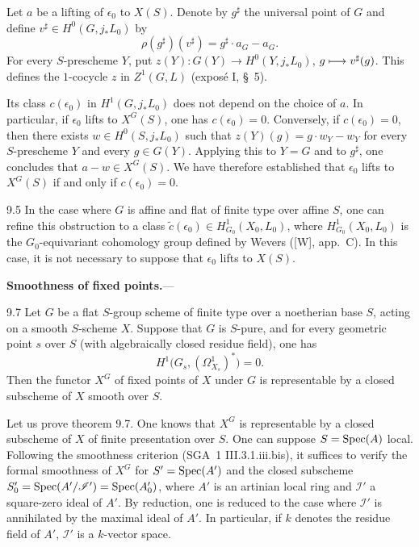 Let $a$ be a lifting of $\epsilon_0$ to $X(S)$. Denote by $g^\sharp$ the universal point of $G$ and define $v^\sharp\in H^0(G,j_*L_0)$ by
\[
\rho(g^\sharp)(v^\sharp)=g^\sharp\cdot a_G-a_G.
\]
For every $S$-prescheme $Y$, put $z(Y):G(Y)\to H^0(Y,j_*L_0)$, $g\longmapsto v^\sharp(g)$. This defines the $1$-cocycle $z$ in $Z^1(G,L)$ (exposé I, §~5).

Its class $c(\epsilon_0)$ in $H^1(G,j_*L_0)$ does not depend on the choice of $a$. In particular, if $\epsilon_0$ lifts to $X^G(S)$, one has $c(\epsilon_0)=0$. Conversely, if $c(\epsilon_0)=0$, then there exists $w\in H^0(S,j_*L_0)$ such that $z(Y)(g)=g\cdot w_Y-w_Y$ for every $S$-prescheme $Y$ and every $g\in G(Y)$. Applying this to $Y=G$ and to $g^\sharp$, one concludes that $a-w\in X^G(S)$. We have therefore established that $\epsilon_0$ lifts to $X^G(S)$ if and only if $c(\epsilon_0)=0$.
\begin{remark}{9.5}\label{XII.9.5}
In the case where $G$ is affine and flat of finite type over affine $S$, one can refine this obstruction to a class $\widetilde c(\epsilon_0)\in H^1_{G_0}(X_0,L_0)$, where $H^1_{G_0}(X_0,L_0)$ is the $G_0$-equivariant cohomology group defined by Wevers ([W], app.~C). In this case, it is not necessary to suppose that $\epsilon_0$ lifts to $X(S)$.
\end{remark}

\textbf{Smoothness of fixed points.}---
\begin{theorem}{9.7}\label{XII.9.7}
Let $G$ be a flat $S$-group scheme of finite type over a noetherian base $S$, acting on a smooth $S$-scheme $X$. Suppose that $G$ is $S$-pure, and for every geometric point $s$ over $S$ (with algebraically closed residue field), one has
\[
H^1\bigl(G_s,(\Omega^1_{X_s})^*\bigr)=0.
\]
Then the functor $X^G$ of fixed points of $X$ under $G$ is representable by a closed subscheme of $X$ smooth over $S$.
\end{theorem}
Let us prove theorem 9.7. One knows that $X^G$ is representable by a closed subscheme of $X$ of finite presentation over $S$. One can suppose $S=\operatorname{Spec}(A)$ local. Following the smoothness criterion (SGA~1 III.3.1.iii.bis), it suffices to verify the formal smoothness of $X^G$ for $S'=\operatorname{Spec}(A')$ and the closed subscheme $S'_0=\operatorname{Spec}(A'/\mathscr I')=\operatorname{Spec}(A'_0)$, where $A'$ is an artinian local ring and $\mathscr I'$ a square-zero ideal of $A'$. By reduction, one is reduced to the case where $\mathscr I'$ is annihilated by the maximal ideal of $A'$. In particular, if $k$ denotes the residue field of $A'$, $\mathscr I'$ is a $k$-vector space.

